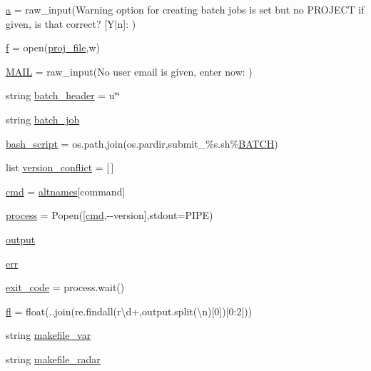 \begin{DoxyCompactItemize}
\item 
\hyperlink{namespacesetup_ac86422d915b07533937fc858abea97a4}{a} = raw\+\_\+input(\textquotesingle{}Warning option for creating batch jobs is set but no P\+R\+O\+J\+E\+CT if given, is that correct? \mbox{[}Y$\vert$n\mbox{]}\+: \textquotesingle{})
\item 
\hyperlink{namespacesetup_aea6945a959274b18887b0be79239ead7}{f} = open(\hyperlink{namespacesetup_aac6afb4198c065254f41a7ce8297da6a}{proj\+\_\+file},\textquotesingle{}w\textquotesingle{})
\item 
\hyperlink{namespacesetup_a4046afba70953007c6ba74e7d9c6bd5f}{M\+A\+IL} = raw\+\_\+input(\textquotesingle{}No user email is given, enter now\+: \textquotesingle{})
\item 
string \hyperlink{namespacesetup_accce39b4aa713fbb290144ec68f888af}{batch\+\_\+header} = u\char`\"{}\char`\"{}
\item 
string \hyperlink{namespacesetup_a86918b8c879471590485d8ac229362b2}{batch\+\_\+job}
\item 
\hyperlink{namespacesetup_a2331c56366b88428b33ad78c625cfcc8}{bash\+\_\+script} = os.\+path.\+join(os.\+pardir,\textquotesingle{}submit\+\_\+\%s.\+sh\textquotesingle{}\%\hyperlink{namespacesetup_a5c8a4998256b5c6d0700ac432fa75d4b}{B\+A\+T\+CH})
\item 
list \hyperlink{namespacesetup_a29c6bb44f4b88076bbd129b6114c9fd2}{version\+\_\+conflict} = \mbox{[}$\,$\mbox{]}
\item 
\hyperlink{namespacesetup_a27ac718b5c714e7f887a5769bb81e54e}{cmd} = \hyperlink{namespacesetup_aaadd587ba3f34c400f5df2cf05a7e1c5}{altnames}\mbox{[}command\mbox{]}
\item 
\hyperlink{namespacesetup_a46c1652bf2b2336d1bf166fc69cbb168}{process} = Popen(\mbox{[}\hyperlink{namespacesetup_a27ac718b5c714e7f887a5769bb81e54e}{cmd},\textquotesingle{}-\/-\/version\textquotesingle{}\mbox{]},stdout=P\+I\+PE)
\item 
\hyperlink{namespacesetup_a9a9fe68847ae604c87e0c586206415d9}{output}
\item 
\hyperlink{namespacesetup_ad9eccefc3ae62bb9f91bbbfa97900e49}{err}
\item 
\hyperlink{namespacesetup_a7e4d34412eadfa1481215bd61b81d64d}{exit\+\_\+code} = process.\+wait()
\item 
\hyperlink{namespacesetup_a8ebf34a9903eb2abbfbd92f17e3b89a4}{fl} = float(\textquotesingle{}.\textquotesingle{}.join(re.\+findall(r\textquotesingle{}\textbackslash{}d+\textquotesingle{},output.\+split(\textquotesingle{}\textbackslash{}n\textquotesingle{})\mbox{[}0\mbox{]})\mbox{[}0\+:2\mbox{]}))
\item 
string \hyperlink{namespacesetup_a11da39b62ca84bc7e300d60f43bf46a8}{makefile\+\_\+var}
\item 
string \hyperlink{namespacesetup_acdec383554bf7f66e8fe06336ebfca98}{makefile\+\_\+radar}
\end{DoxyCompactItemize}


